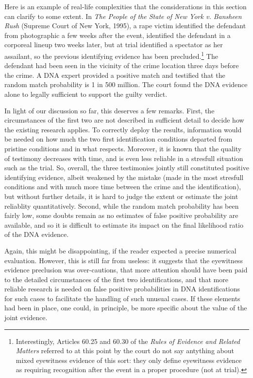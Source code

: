 \documentclass[
  10pt,
  dvipsnames,enabledeprecatedfontcommands]{scrartcl}
\newcommand{\mar}[1]{\todo[color=blue!40]{#1}}
\begin{document}
\mar{added a discussion of Rush, take a look and let me know what you think}

Here is an example of real-life complexities that the considerations in
this section can clarify to some extent. In
\emph{The People of the State of New York v. Bansheen Rush} (Supreme
Court of New York, 1995), a rape victim identified the defendant from
photographic a few weeks after the event, identified the defendant in a
corporeal lineup two weeks later, but at trial identified a spectator as
her assailant, so the previous identifying evidence has been
precluded.\footnote{Interestingly, Articles 60.25 and 60.30 of the \emph{Rules of Evidence and Related Matters} referred to at this point by the court do not say antything about mixed eyewitness evidence of this sort: they only define eyewitness evidence as requiring recognition after the event in a proper  procedure (not at trial).}
The defendant had been seen in the vicinity of the crime location three
days before the crime. A DNA expert provided a positive match and
testified that the random match probability is 1 in 500 million. The
court found the DNA evidence alone to legally sufficient to support the
guilty verdict.

In light of our discussion so far, this deserves a few remarks. First,
the circumstances of the first two are not described in sufficient
detail to decide how the existing research applies. To correctly deploy
the results, information would be needed on how much the two first
identification conditions departed from pristine conditions and in what
respects. Moreover, it is known that the quality of testimony decreases
with time, and is even less reliable in a stresfull situation such as
the trial. So, overall, the three testimonies jointly still constituted
positive identifying evidence, albeit weakened by the mistake (made in
the most stresfull conditions and with much more time between the crime
and the identification), but without further details, it is hard to
judge the extent or estimate the joint reliablity quantitatively.
Second, while the random match probability has been fairly low, some
doubts remain as no estimates of false positive probability are
available, and so it is difficult to estimate its impact on the final
likelihood ratio of the DNA evidence.

Again, this might be disappointing, if the reader expected a precise
numerical evaluation. However, this is still far from useless: it
suggests that the eyewitness evidence preclusion was over-cautions, that
more attention should have been paid to the detailed circumstances of
the first two identifications, and that more reliable research is needed
on false positive probabilities in DNA identifications for such cases to
facilitate the handling of such unusual cases. If these elements had
been in place, one could, in principle, be more specific about the value
of the joint evidence.
\end{document}
